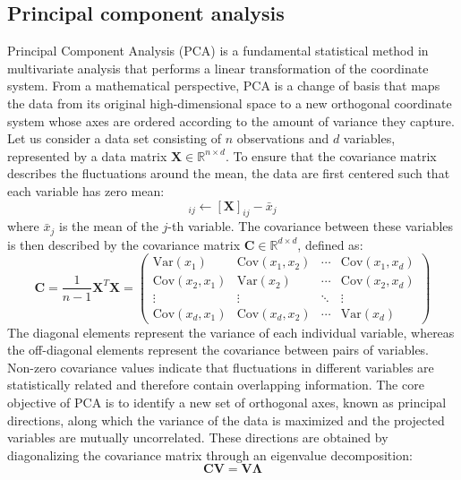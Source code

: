 \subsection{Principal component analysis}
Principal Component Analysis (PCA) is a fundamental statistical method in multivariate analysis that performs a linear transformation of the coordinate system. From a mathematical perspective, PCA is a change of basis that maps the data from its original high-dimensional space to a new orthogonal coordinate system whose axes are ordered according to the amount of variance they capture.
Let us consider a data set consisting of $n$ observations and $d$ variables, represented by a data matrix $\mathbf{X} \in \mathbb{R}^{n \times d}$. To ensure that the covariance matrix describes the fluctuations around the mean, the data are first centered such that each variable has zero mean:
\begin{equation}
[\mathbf{X}]_{ij} \leftarrow [\mathbf{X}]_{ij} - \bar{x}_j
\end{equation}
where $\bar{x}_j$ is the mean of the $j$-th variable. The covariance between these variables is then described by the covariance matrix $\mathbf{C} \in \mathbb{R}^{d \times d}$, defined as:
\begin{equation}
\mathbf{C} = \frac{1}{n-1} \mathbf{X}^T \mathbf{X} =
\begin{pmatrix}
\mathrm{Var}(x_1) & \mathrm{Cov}(x_1,x_2) & \cdots & \mathrm{Cov}(x_1,x_d) \\
\mathrm{Cov}(x_2,x_1) & \mathrm{Var}(x_2) & \cdots & \mathrm{Cov}(x_2,x_d) \\
\vdots & \vdots & \ddots & \vdots \\
\mathrm{Cov}(x_d,x_1) & \mathrm{Cov}(x_d,x_2) & \cdots & \mathrm{Var}(x_d)
\end{pmatrix}
\end{equation}
The diagonal elements represent the variance of each individual variable, whereas the off-diagonal elements represent the covariance between pairs of variables. Non-zero covariance values indicate that fluctuations in different variables are statistically related and therefore contain overlapping information.
The core objective of PCA is to identify a new set of orthogonal axes, known as principal directions, along which the variance of the data is maximized and the projected variables are mutually uncorrelated. These directions are obtained by diagonalizing the covariance matrix through an eigenvalue decomposition:
\begin{equation}
\mathbf{C}\mathbf{V} = \mathbf{V}\mathbf{\Lambda}
\end{equation}
